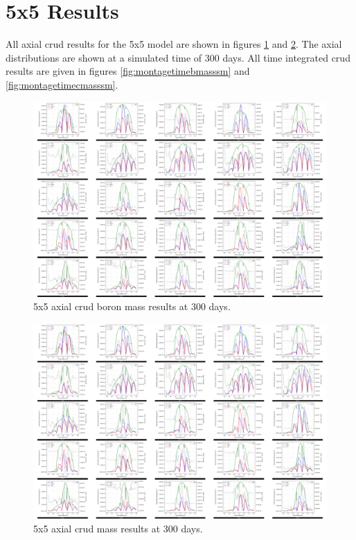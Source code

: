 
\section{5x5 Results}

All axial crud results for the 5x5 model are shown in figures \ref{fig:montageaxialbmasssm} and \ref{fig:montageaxialcmasssm}.  The axial distributions are shown at a simulated time of 300 days. All time integrated crud results are given in figures \ref{fig:montagetimebmasssm} and \ref{fig:montagetimecmasssm}.

\begin{landscape}
\begin{figure}[H]
    \centering
    \includegraphics[width=.9\linewidth]{figs/5x5/imp/montage_axial_bmass_sm}
    \caption{5x5 axial crud boron mass results at 300 days.}
    \label{fig:montageaxialbmasssm}
\end{figure}
\begin{figure}[H]
    \centering
    \includegraphics[width=.9\linewidth]{figs/5x5/imp/montage_axial_cmass_sm}
    \caption{5x5 axial crud mass results at 300 days.}
    \label{fig:montageaxialcmasssm}
\end{figure}


\end{landscape}
